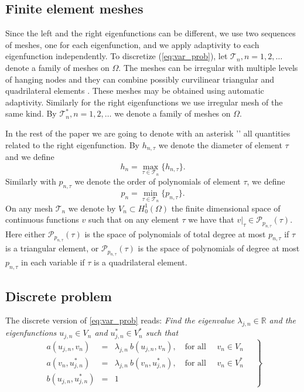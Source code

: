 \documentclass[smallextended]{svjour3}
\newcommand{\cT}{\mathcal{T}}
\begin{document}
\subsection{Finite element meshes}
Since the left and the right eigenfunctions can be 
different, we use two sequences of meshes, one for each eigenfunction, 
and we apply adaptivity to each eigenfunction independently. 
To discretize (\ref{eq:var_prob}), let $\cT_n, n =
1,2,\ldots $ denote a family of meshes on $\Omega$.
The meshes can be irregular with multiple levels of hanging nodes 
and they can combine possibly curvilinear triangular and quadrilateral 
elements \cite{solin3}. These meshes may be obtained using automatic adaptivity. 
Similarly for the right eigenfunctions we use irregular mesh of the same kind.
By $\cT_n^*, n = 1,2,\ldots $ we denote a family of meshes on $\Omega$.

In the rest of the paper we are going to denote with an asterisk '{\tt *}'  all quantities related 
to the right eigenfunction. By $h_{n,\tau}$ we denote the diameter of element $\tau$ and
we define
$$
h_n=\max_{\tau\in \mathcal{T}_n}\{h_{n,\tau}\}.
$$
Similarly with  $p_{n,\tau}$ we denote  the order of polynomials of element $\tau$,  
we define
$$
p_n=\min_{\tau\in \mathcal{T}_n}\{p_{n,\tau}\}.
$$
On any mesh $\mathcal{T}_n$ we denote by $V_n \subset H^1_0(\Omega)$ the finite
dimensional space of continuous functions $v$ such that on any element $\tau$ we 
have that $v|_\tau\in \mathcal{P}_{p_{n,\tau}}(\tau)$. Here either $\mathcal{P}_{p_{n,\tau}}(\tau)$ 
is the space of polynomials of total degree at most $p_{n,\tau}$ if $\tau$ is a triangular 
element, or $\mathcal{P}_{p_{n,\tau}}(\tau)$ is the space of polynomials of degree at most 
$p_{n,\tau}$ in each variable if $\tau$ is a quadrilateral element.

\subsection{Discrete problem}

The discrete version of \eqref{eq:var_prob} reads:
\emph{Find the eigenvalue $\lambda_{j,n}\in \mathbb{R}$ and the eigenfunctions $u_{j,n}\in V_n$ and $u_{j,n}^*\in V_n^*$
such that}
\begin{equation}
\label{eq:disc_prob}
\left.
\begin{array}{lcl}
a(u_{j,n},v_{n})&=& \lambda_{j,n}\ b(u_{j,n},v_{n}),
\quad \text{for all } \quad v_{n}  \in V_n\\
a(v_{n},u_{j,n}^*)&=& \lambda_{j,n}\ b(v_{n},u_{j,n}^*),
\quad \text{for all } \quad v_{n}  \in V_n^*\\
 b(u_{j,n},u_{j,n}^*) &=& 1
\end{array}\quad
\right\}
\end{equation}
\end{document}
